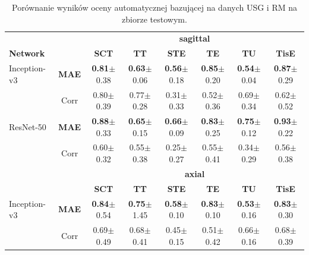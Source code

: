 \begin{table}[h]
	\footnotesize
	\setlength{\tabcolsep}{1pt}
	\centering
	\caption{Porównanie wyników oceny automatycznej bazującej na danych USG i RM na zbiorze testowym.}
	\label{tab:USGvsRM-cross-validation}
	\vspace{-0.5cm}
	\begin{tabular}{lc||c|c|c|c|c|c}
		& & \multicolumn{6}{c}{\normalsize{\textbf{sagittal}}} \\
		\textbf{Network} & & \textbf{SCT} & \textbf{TT} & \textbf{STE} & \textbf{TE} & \textbf{TU} & \textbf{TisE} \\ \hline
		Inception-v3 & \textbf{MAE} & \textbf{0.81}$\pm$0.38 & \textbf{0.63}$\pm$0.06 & \textbf{0.56}$\pm$0.18 & \textbf{0.85}$\pm$0.20 & \textbf{0.54}$\pm$0.04 & \textbf{0.87}$\pm$0.29 \\
		& Corr & 0.80$\pm$0.39 & 0.77$\pm$0.28 & 0.31$\pm$0.33 & 0.52$\pm$0.36 & 0.69$\pm$0.34 & 0.62$\pm$0.52 \\ \hline
		ResNet-50 & \textbf{MAE} & \textbf{0.88}$\pm$0.33 & \textbf{0.65}$\pm$0.15 & \textbf{0.66}$\pm$0.09 & \textbf{0.83}$\pm$0.25 & \textbf{0.75}$\pm$0.12 & \textbf{0.93}$\pm$0.22 \\
		& Corr & 0.60$\pm$0.32 & 0.55$\pm$0.38 & 0.25$\pm$0.27 & 0.55$\pm$0.41 & 0.34$\pm$0.29 & 0.56$\pm$0.38 \\
		\hline \hline
		& & \multicolumn{6}{c}{\normalsize{\textbf{axial}}} \\
		& & \textbf{SCT} & \textbf{TT} & \textbf{STE} & \textbf{TE} & \textbf{TU} & \textbf{TisE}\\ \hline
		Inception-v3 & \textbf{MAE} & \textbf{0.84}$\pm$0.54 & \textbf{0.75}$\pm$1.45 & \textbf{0.58}$\pm$0.10 & \textbf{0.83}$\pm$0.10 & \textbf{0.53}$\pm$0.16 & \textbf{0.83}$\pm$0.30 \\
		& Corr & 0.69$\pm$0.49 & 0.68$\pm$0.41 & 0.45$\pm$0.15 & 0.51$\pm$0.42 & 0.66$\pm$0.16 & 0.68$\pm$0.39 \\ \hline

\end{tabular}
\end{table}
